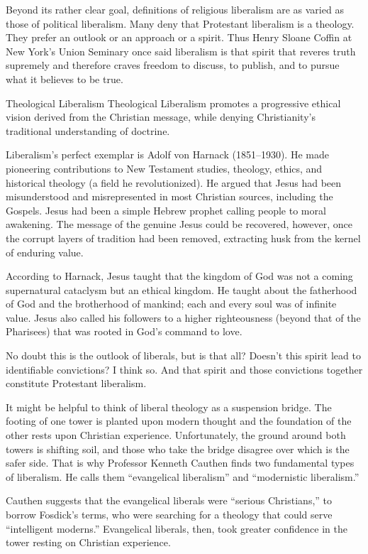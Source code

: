 Beyond its rather clear goal, definitions of religious liberalism are as varied as those of
political liberalism. Many deny that Protestant liberalism is a theology. They prefer an outlook or
an approach or a spirit. Thus Henry Sloane Coffin at New York’s Union Seminary once said liberalism
is that spirit that reveres truth supremely and therefore craves freedom to discuss, to publish, and
to pursue what it believes to be true.

\begin{sidebar}{Theological Liberalism}
Theological Liberalism promotes a progressive ethical vision derived from the Christian message,
while denying Christianity’s traditional understanding of doctrine.

Liberalism’s perfect exemplar is Adolf von Harnack (1851–1930). He made pioneering contributions to
New Testament studies, theology, ethics, and historical theology (a field he revolutionized). He
argued that Jesus had been misunderstood and misrepresented in most Christian sources, including the
Gospels. Jesus had been a simple Hebrew prophet calling people to moral awakening. The message of
the genuine Jesus could be recovered, however, once the corrupt layers of tradition had been
removed, extracting husk from the kernel of enduring value.

According to Harnack, Jesus taught that the kingdom of God was not a coming supernatural cataclysm
but an ethical kingdom. He taught about the fatherhood of God and the brotherhood of mankind; each
and every soul was of infinite value. Jesus also called his followers to a higher righteousness
(beyond that of the Pharisees) that was rooted in God’s command to love.
\end{sidebar}

No doubt this is the outlook of liberals, but is that all? Doesn’t this spirit lead to identifiable
convictions? I think so. And that spirit and those convictions together constitute Protestant
liberalism.

It might be helpful to think of liberal theology as a suspension bridge. The footing of one tower is
planted upon modern thought and the foundation of the other rests upon Christian experience.
Unfortunately, the ground around both towers is shifting soil, and those who take the bridge
disagree over which is the safer side. That is why Professor Kenneth Cauthen finds two fundamental
types of liberalism. He calls them “evangelical liberalism” and “modernistic liberalism.”

Cauthen suggests that the evangelical liberals were “serious Christians,” to borrow Fosdick’s terms,
who were searching for a theology that could serve “intelligent moderns.” Evangelical liberals,
then, took greater confidence in the tower resting on Christian experience.

